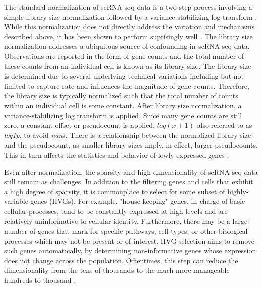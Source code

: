 The standard normalization of scRNA-seq data is a two step process involving a simple library size normalization followed by a variance-stabilizing log transform \cite{luecken2019}.
While this normalization does not directly address the variation and mechanisms described above, it has been shown to perform suprisingly well \cite{ahlmann-eltze2023}.
The library size normalization addresses a ubiquitous source of confounding in scRNA-seq data.
Observations are reported in the form of gene counts and the total number of these counts from an individual cell is known as its library size.
The library size is determined due to several underlying technical variations including but not limited to capture rate \cite{lytal2020} and influences the magnitude of gene counts.
Therefore, the library size is typically normalized such that the total number of counts within an individual cell is some constant.
After library size normalization, a variance-stabilizing log transform is applied.
Since many gene counts are still zero, a constant offset or pseudocount is applied, $log(x + 1)$ also referred to as \textit{log1p}, to avoid \textit{nan}s.
There is a relationship between the normalized library size and the pseudocount, as smaller library sizes imply, in effect, larger pseudocounts.
This in turn affects the statistics and behavior of lowly expressed genes \cite{ahlmann-eltze2023}. %

Even after normalization, the sparsity and high-dimensionality of scRNA-seq data still remain as challenges.
In addition to the filtering genes and cells that exhibit a high degree of sparsity, it is commonplace to select for some subset of highly-variable genes (HVGs).
For example, "house keeping" genes, in charge of basic cellular processes, tend to be constantly expressed at high levels and are relatively uninformative to cellular identity.
Furthermore, there may be a large number of genes that mark for specific pathways, cell types, or other biological processes which may not be present or of interest.
HVG selection aims to remove such genes automatically, by determining non-informative genes whose expression does not change across the population.
Oftentimes, this step can reduce the dimensionality from the tens of thousands to the much more manageable hundreds to thousand \cite{satija2015,zheng2017,stuart2019}.

